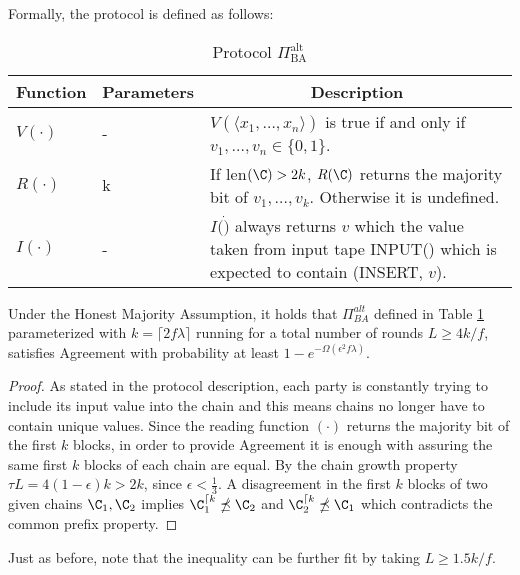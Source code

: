 \documentclass[..]{subfiles}
\begin{document}
Formally, the protocol is defined as follows:

\begin{centering}
	\begin{table}[H]
	\begin{tabular}{m{}<{\centering} m{}<{\centering} m{}}
		\toprule
		\textbf{Function } & \textbf{Parameters} & \multicolumn{1}{c}{\textbf{Description}}\\
		\toprule
		$V(\cdot)$ & - & $V(\langle x_1, \dots, x_n \rangle)$ is true if and only if $v_1, \dots, v_n \in \{0, 1\}$.\\
		\hline
		$R(\cdot)$ & k & If len$(\C) > 2k$, $R(\C)$ returns the majority bit of $v_1, \dots, v_k$. Otherwise it is undefined.\\
		\hline
		$I(\cdot)$ & - & $I(\dot)$ always returns $v$ which the value taken from input tape INPUT() which is expected to contain (INSERT, $v$).\\
		\bottomrule
	\end{tabular}
	\caption{Protocol $\Pi_{\textrm{BA}}^{\textrm{alt}}$}
	\label{tab:protocolAlt}
	\end{table}
\end{centering}

\begin{lemma}[Agreement]
	Under the Honest Majority Assumption, it holds that $\Pi_{BA}^{alt}$ defined in Table \ref{tab:protocolAlt} parameterized with $k=\lceil 2f\lambda \rceil$ running for a total number of rounds $L \ge 4k/f$, satisfies Agreement with probability at least $1 - e^{-\Omega(\epsilon^2 f \lambda)}$.
\end{lemma}
\begin{proof}
	As stated in the protocol description, each party is constantly trying to include its input value into the chain and this means chains no longer have to contain unique values. Since the reading function $(\cdot)$ returns the majority bit of the first $k$ blocks, in order to provide Agreement it is enough with assuring the same first $k$ blocks of each chain are equal. By the chain growth property $\tau L = 4 (1-\epsilon)k > 2k$, since $\epsilon < \frac{1}{3}$. A disagreement in the first $k$ blocks of two given chains $\C_1, \C_2$ implies $\C_1^{\lceil k} \npreceq \C_2$ and $\C_2^{\lceil k} \npreceq \C_1$ which contradicts the common prefix property.
\end{proof}
Just as before, note that the inequality can be further fit by taking $L \ge 1.5k/f$.
\end{document}
